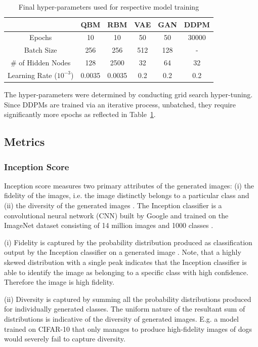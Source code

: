 \documentclass[%
 reprint,
 amsmath,amssymb,
 aps,
]{revtex4-2}
\begin{document}
\begin{table}[h]
\caption{\label{tab:hyperparams} Final hyper-parameters used for respective model training}
\begin{ruledtabular}
\begin{tabular}{cccccc}
& QBM & RBM & VAE & GAN & DDPM\\\hline
 Epochs & 10 & 10 & 50 & 50 & 30000\\ \hline
 Batch Size & 256 & 256 & 512 & 128 & - \\ \hline
 \# of Hidden Nodes & 128 & 2500 & 32 & 64 & 32 \\ \hline
 Learning Rate ($10^{-3}$) & 0.0035 & 0.0035 & 0.2 & 0.2 & 0.2
\end{tabular}
\end{ruledtabular}
\end{table}


The hyper-parameters were determined by conducting grid search hyper-tuning. Since DDPMs are trained via an iterative process, unbatched, they require significantly more epochs as reflected in Table~\ref{tab:hyperparams}.


\subsection{Metrics}
\label{metrics_}
\subsubsection{Inception Score}
Inception score measures two primary attributes of the generated images: (i) the fidelity of the images, i.e. the image distinctly belongs to a particular class and (ii) the diversity of the generated images \cite{mack_2019}. The Inception classifier is a convolutional neural network (CNN) built by Google and trained on the ImageNet dataset consisting of 14 million images and 1000 classes \cite{inception_model}.


(i) Fidelity is captured by the probability distribution produced as classification output by the Inception classifier on a generated image \cite{mack_2019}. Note, that a highly skewed distribution with a single peak indicates that the Inception classifier is able to identify the image as belonging to a specific class with high confidence. Therefore the image is high fidelity.



(ii) Diversity is captured by summing all the probability distributions produced for individually generated classes. The uniform nature of the resultant sum of distributions is indicative of the diversity of generated images. E.g. a model trained on CIFAR-10 that only manages to produce high-fidelity images of dogs would severely fail to capture diversity.
\end{document}

